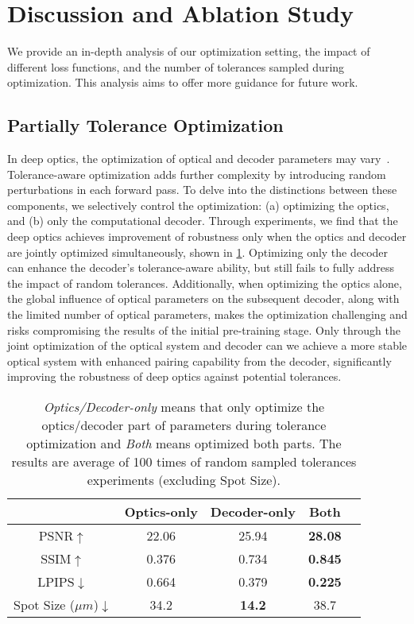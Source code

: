 \section{Discussion and Ablation Study}
\label{sec:ablations}
We provide an in-depth analysis of our optimization setting, the impact of different loss functions, and the number of tolerances sampled during optimization. This analysis aims to offer more guidance for future work.

\subsection{Partially Tolerance Optimization}
In deep optics, the optimization of optical and decoder parameters may vary~\cite{tseng2021differentiable}. Tolerance-aware optimization adds further complexity by introducing random perturbations in each forward pass. To delve into the distinctions between these components, we selectively control the optimization: (a) optimizing the optics, and (b) only the computational decoder. Through experiments, we find that the deep optics achieves improvement of robustness only when the optics and decoder are jointly optimized simultaneously, shown in \cref{tab:partly-tolerance}. 
Optimizing only the decoder can enhance the decoder's tolerance-aware ability, but still fails to fully address the impact of random tolerances. Additionally, when optimizing the optics alone, the global influence of optical parameters on the subsequent decoder, along with the limited number of optical parameters, makes the optimization challenging and risks compromising the results of the initial pre-training stage. Only through the joint optimization of the optical system and decoder can we achieve a more stable optical system with enhanced pairing capability from the decoder, significantly improving the robustness of deep optics against potential tolerances.


\begin{table}
\centering
\caption{\emph{Optics/Decoder-only} means that only optimize the optics/decoder part of parameters during tolerance optimization and \emph{Both} means optimized both parts. The results are average of 100 times of random sampled tolerances experiments (excluding Spot Size).}
\begin{tabular}{c|c c c c}
\hline
 & Optics-only & Decoder-only & Both \\
\hline
PSNR$\uparrow$ & 22.06 & 25.94 & \bf{28.08} \\
SSIM$\uparrow$ & 0.376 & 0.734 & \bf{0.845} \\
LPIPS$\downarrow$ & 0.664 & 0.379 & \bf{0.225} \\
Spot Size ($\mu m$)$\downarrow$ & 34.2 & \textbf{14.2} & 38.7 \\
\hline
\end{tabular}
\label{tab:partly-tolerance}
\end{table}

